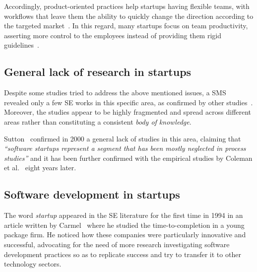 \documentclass[10pt,journal,letterpaper,compsoc]{IEEEtran}
\begin{document}
Accordingly, product-oriented practices help startups having flexible teams,
with workflows that leave them the ability to quickly change the direction
according to the targeted market~\cite{Heitlager2007,Sutton2000}. In this
regard, many startups focus on team productivity, asserting more control to the
employees instead of providing them rigid guidelines~\cite{Tanabian2005,
Chorev2006, Kakati2003}.

\subsection{General lack of research in startups} Despite some studies tried to
address the above mentioned issues, a SMS~\cite{SMS} revealed only a few SE
works in this specific area, as confirmed by other studies~\cite{Coleman2008,
Coleman2008a, Coleman2007, Sutton2000}. Moreover, the studies appear to be 
highly fragmented and spread across different areas rather than constituting a 
consistent \textit{body of knowledge}.

Sutton~\cite{Sutton2000} confirmed in 2000 a general lack of studies in this 
area, claiming that \textit{``software startups represent a segment that has 
been mostly neglected in process studies''} and it has been further confirmed 
with the empirical studies by Coleman et 
al.~\cite{Coleman2008,Coleman2008a,Coleman2007} eight years later.

\subsection{Software development in startups}

The word \textit{startup} appeared in the SE literature for the first time in
1994 in an article written by Carmel~\cite{Camel1994a} where he studied the
time-to-completion in a young package firm. %
He noticed how these companies were particularly innovative and successful, 
advocating for the need of more research investigating software development 
practices so as to replicate success and try to transfer it to other 
technology sectors.
\end{document}
